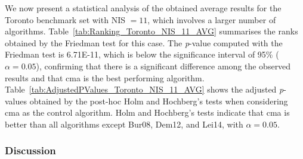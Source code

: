 We now present a statistical analysis of the obtained average results for the Toronto benchmark set with NIS $= 11$, which involves a larger number of algorithms. Table~\ref{tab:Ranking_Toronto_NIS_11_AVG} summarises the ranks obtained by the Friedman test for this case. The \textit{p}-value computed with the Friedman test is \num{6.71E-11}, which is below the significance interval of 95\% ($\alpha = 0.05$), confirming that there is a significant difference among the observed results and that \gls{cma} is the best performing algorithm. Table~\ref{tab:AdjustedPValues_Toronto_NIS_11_AVG} shows the adjusted \textit{p}-values obtained by the post-hoc Holm and Hochberg's tests when considering \gls{cma} as the control algorithm. Holm and Hochberg's tests indicate that \gls{cma} is better than all algorithms except Bur08, Dem12, and Lei14, with $\alpha = 0.05$. 




\subsubsection{Discussion}

